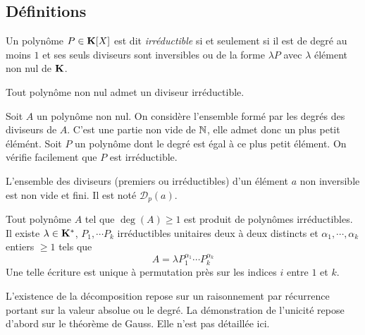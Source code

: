 \subsection{Définitions}
\begin{defi}
 Un polynôme $P\in \mathbf{K}[X]$ est dit \emph{irréductible} si et seulement si il est de degré au moins $1$ et ses seuls diviseurs sont inversibles ou de la forme $\lambda P$ avec $\lambda$ élément non nul de $\mathbf{K}$. 
\end{defi}
\begin{prop}
 Tout polynôme non nul admet un diviseur  irréductible.
\end{prop}
\begin{demo}
 Soit $A$ un polynôme non nul. On considère l'ensemble formé par les degrés des diviseurs de $A$. C'est une partie non vide de $\mathbb{N}$, elle admet donc un plus petit élémént. Soit $P$ un polynôme dont le degré est égal à ce plus petit élément. On vérifie facilement que $P$ est irréductible. 
\end{demo}
\begin{nota}
L'ensemble des diviseurs (premiers ou irréductibles) d'un élément $a$ non inversible est non vide et fini. Il est noté $\mathcal D_p(a)$. 
\end{nota}
\begin{prop}
Tout polynôme $A$ tel que $\deg(A)\geq 1$ est produit de polynômes irréductibles. 
 Il existe  $\lambda \in \mathbf{K}^*$, $P_1,\cdots P_k$ irréductibles unitaires deux à deux distincts et $\alpha_1,\cdots,\alpha_k$ entiers $\geq 1$ tels que
\begin{displaymath}
 A = \lambda P_1^{\alpha_1} \cdots P_k^{\alpha_k} 
\end{displaymath}
Une telle écriture est unique à permutation près sur les indices $i$ entre $1$ et $k$.
\end{prop}
\begin{demo}
 L'existence de la décomposition repose sur un raisonnement par récurrence portant sur la valeur absolue ou le degré. La démonstration de l'unicité repose d'abord sur le théorème de Gauss. Elle n'est pas détaillée ici.
\end{demo}
